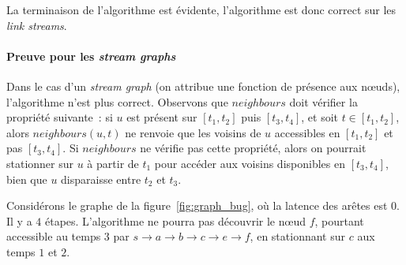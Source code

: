 \documentclass[12pt,a4paper]{article}
\begin{document}
La terminaison de l'algorithme est évidente, l'algorithme est donc
correct sur les \textit{link streams}.

\paragraph{Preuve pour les \textit{stream graphs}} Dans le cas d'un
\textit{stream graph} (on attribue une fonction de présence aux
nœuds), l'algorithme n'est plus correct. Observons que \(neighbours\)
doit vérifier la propriété suivante~: si \(u\) est présent sur
\([t_1, t_2]\) puis \([t_3, t_4]\), et soit \(t \in [t_1, t_2]\),
alors \(neighbours(u, t)\) ne renvoie que les voisins de \(u\)
accessibles en \([t_1, t_2]\) et pas \([t_3, t_4]\). Si \(neighbours\)
ne vérifie pas cette propriété, alors on pourrait stationner sur \(u\)
à partir de \(t_1\) pour accéder aux voisins disponibles en
\([t_3, t_4]\), bien que \(u\) disparaisse entre \(t_2\) et \(t_3\).

Considérons le graphe de la figure~\ref{fig:graph_bug}, où la latence
des arêtes est \(0\). Il y a \(4\) étapes. L'algorithme ne pourra pas
découvrir le nœud \(f\), pourtant accessible au temps 3 par
\(s \rightarrow a \rightarrow b \rightarrow c \rightarrow e
\rightarrow f\), en stationnant sur \(c\) aux temps \(1\) et \(2\).
\end{document}
